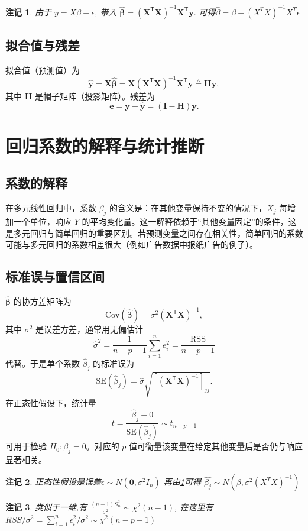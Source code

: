 \documentclass[UTF8]{ctexart}
\newtheorem{remark}{注记}[section]
\numberwithin{equation}{section}
\begin{document}
\begin{remark}\label{remark1}
    由于 $y = X\beta+\epsilon$, 带入
    $\hat{\boldsymbol{\beta}} = 
    (\mathbf{X}^\mathsf{T}\mathbf{X})^{-1} \mathbf{X}^\mathsf{T} \mathbf{y}.$
    可得$\hat{\beta}= \beta + (X^TX)^{-1}X^T\epsilon$
\end{remark}

\subsection{拟合值与残差}

拟合值（预测值）为
\[
\hat{\mathbf{y}} = \mathbf{X}\hat{\boldsymbol{\beta}} = \mathbf{X}(\mathbf{X}^\mathsf{T}\mathbf{X})^{-1}\mathbf{X}^\mathsf{T}\mathbf{y} \triangleq \mathbf{H}\mathbf{y},
\]
其中 \(\mathbf{H}\) 是帽子矩阵（投影矩阵）。残差为
\[
\mathbf{e} = \mathbf{y} - \hat{\mathbf{y}} = (\mathbf{I} - \mathbf{H})\mathbf{y}.
\]

\section{回归系数的解释与统计推断}

\subsection{系数的解释}

在多元线性回归中，系数 \(\beta_j\) 的含义是：在其他变量保持不变的情况下，\(X_j\) 每增加一个单位，响应 \(Y\) 的平均变化量。这一解释依赖于“其他变量固定”的条件，这是多元回归与简单回归的重要区别。若预测变量之间存在相关性，简单回归的系数可能与多元回归的系数相差很大（例如广告数据中报纸广告的例子）。

\subsection{标准误与置信区间}

\(\hat{\boldsymbol{\beta}}\) 的协方差矩阵为
\[
\mathrm{Cov}(\hat{\boldsymbol{\beta}}) = \sigma^2 (\mathbf{X}^\mathsf{T}\mathbf{X})^{-1},
\]
其中 \(\sigma^2\) 是误差方差，通常用无偏估计
\[
\hat{\sigma}^2 = \frac{1}{n-p-1} \sum_{i=1}^n e_i^2 = \frac{\mathrm{RSS}}{n-p-1}
\]
代替。于是单个系数 \(\hat{\beta}_j\) 的标准误为
\[
\mathrm{SE}(\hat{\beta}_j) = \hat{\sigma} \sqrt{[(\mathbf{X}^\mathsf{T}\mathbf{X})^{-1}]_{jj}}.
\]
在正态性假设下，统计量
\[
t = \frac{\hat{\beta}_j - 0}{\mathrm{SE}(\hat{\beta}_j)} \sim t_{n-p-1}
\]
可用于检验 \(H_0: \beta_j = 0\)。对应的 \(p\) 值可衡量该变量在给定其他变量后是否仍与响应显著相关。
\begin{remark}
    正态性假设是误差$\epsilon\sim   N(\mathbf{0},\sigma^2I_n)$
    再由\ref{remark1}可得
    $\hat{\beta_j}\sim N(\beta,\sigma^2(X^TX)^{-1})$
\end{remark}
\begin{remark}\label{RSSchi}
    类似于一维,有 $ \frac{(n-1)S^2_n}{\sigma^2}
    \sim \chi^2(n-1)$, 在这里有 $RSS/\sigma^2 = 
    \sum_{i=1}^{n}\epsilon^2_i/\sigma^2 
    \sim \chi^2(n-p-1) $
\end{remark}
\end{document}
